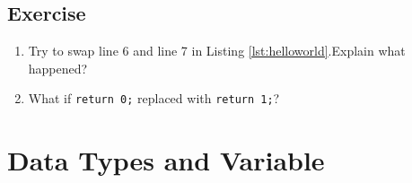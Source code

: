 \subsection{Exercise}
\begin{enumerate}
	\item Try to swap line 6 and line 7 in Listing \ref{lst:helloworld}.Explain what happened?
	\item What if \verb|return 0;| replaced with \verb|return 1;|?
\end{enumerate}


\section{Data Types and Variable}
